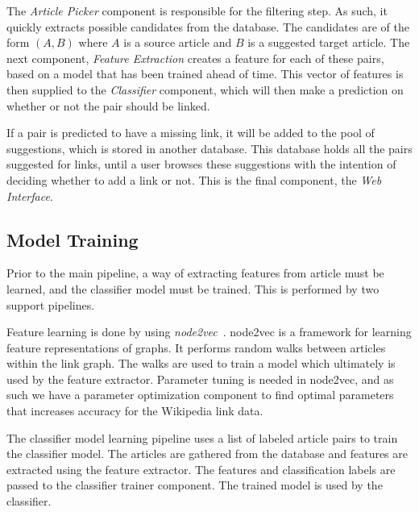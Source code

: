 The \emph{Article Picker} component is responsible for the filtering step. As such, it quickly extracts possible candidates from the database. The candidates are of the form $(A,B)$ where $A$ is a source article and $B$ is a suggested target article. The next component, \emph{Feature Extraction} creates a feature for each of these pairs, based on a model that has been trained ahead of time. This vector of features is then supplied to the \emph{Classifier} component, which will then make a prediction on whether or not the pair should be linked.

If a pair is predicted to have a missing link, it will be added to the pool of suggestions, which is stored in another database. This database holds all the pairs suggested for links, until a user browses these suggestions with the intention of deciding whether to add a link or not. This is the final component, the \emph{Web Interface}.


\subsection{Model Training}
Prior to the main pipeline, a way of extracting features from article must be learned, and the classifier model must be trained. This is performed by two support pipelines.

Feature learning is done by using \emph{node2vec}~\cite{node2vec}. node2vec is a framework for learning feature representations of graphs. It performs random walks between articles within the link graph. The walks are used to train a model which ultimately is used by the feature extractor. Parameter tuning is needed in node2vec, and as such we have a parameter optimization component to find optimal parameters that increases accuracy for the Wikipedia link data.

The classifier model learning pipeline uses a list of labeled article pairs to train the classifier model. The articles are gathered from the database and features are extracted using the feature extractor. The features and classification labels are passed to the classifier trainer component. The trained model is used by the classifier.










